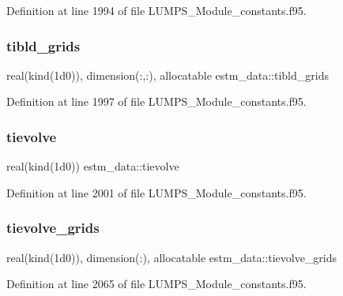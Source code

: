 Definition at line 1994 of file L\+U\+M\+P\+S\+\_\+\+Module\+\_\+constants.\+f95.

\mbox{\label{namespaceestm__data_a0779bf7064e6250f2aecbe275a47b0d6}} 
\subsubsection{\texorpdfstring{tibld\+\_\+grids}{tibld\_grids}}
{\footnotesize\ttfamily real(kind(1d0)), dimension(\+:,\+:), allocatable estm\+\_\+data\+::tibld\+\_\+grids}



Definition at line 1997 of file L\+U\+M\+P\+S\+\_\+\+Module\+\_\+constants.\+f95.

\mbox{\label{namespaceestm__data_a687144263fbc75d151299c74dba252b9}} 
\subsubsection{\texorpdfstring{tievolve}{tievolve}}
{\footnotesize\ttfamily real(kind(1d0)) estm\+\_\+data\+::tievolve}



Definition at line 2001 of file L\+U\+M\+P\+S\+\_\+\+Module\+\_\+constants.\+f95.

\mbox{\label{namespaceestm__data_aea3b637710882c735bbac0ace538e0f4}} 
\subsubsection{\texorpdfstring{tievolve\+\_\+grids}{tievolve\_grids}}
{\footnotesize\ttfamily real(kind(1d0)), dimension(\+:), allocatable estm\+\_\+data\+::tievolve\+\_\+grids}



Definition at line 2065 of file L\+U\+M\+P\+S\+\_\+\+Module\+\_\+constants.\+f95.

\mbox{\label{namespaceestm__data_a50154a0f89e449784f754f7109a400a6}} 
